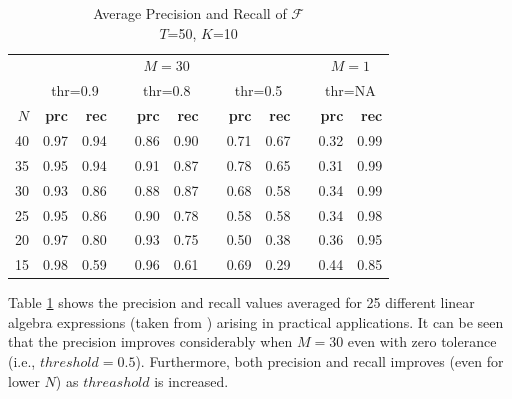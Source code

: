 \documentclass[conference]{IEEEtran}
\begin{document}
\begin{table}[h!]
	\begin{center}
		\renewcommand{\arraystretch}{1.2}
		\begin{tabular}{@{}r rr c rr c rr c rr@{}}
			\toprule
			& \multicolumn{8}{c}{$M=30$} & & \multicolumn{2}{c}{$M=1$} \\
			\cmidrule{2-9} \cmidrule{11-12}
			& \multicolumn{2}{c}{thr=0.9} & & \multicolumn{2}{c}{thr=0.8} & & \multicolumn{2}{c}{thr=0.5} & & \multicolumn{2}{c}{thr=NA} \\
			\cmidrule{2-3} \cmidrule{5-6} \cmidrule{8-9} \cmidrule{11-12}
			{$N$} & \textbf{prc} & \textbf{rec} && \textbf{prc} & \textbf{rec} && \textbf{prc} & \textbf{rec} && \textbf{prc} & \textbf{rec} \\
			\midrule
			{40} & 0.97  & 0.94  && 0.86  & 0.90  && 0.71  & 0.67 && 0.32 & 0.99 \\
			{35} & 0.95  & 0.94  && 0.91  & 0.87  && 0.78  & 0.65 && 0.31 & 0.99 \\
			{30} & 0.93  & 0.86  && 0.88  & 0.87  && 0.68  & 0.58 && 0.34 & 0.99 \\
			{25} & 0.95  & 0.86  && 0.90  & 0.78  && 0.58  & 0.58 && 0.34 & 0.98 \\
			{20} & 0.97  & 0.80  && 0.93  & 0.75  && 0.50  & 0.38 && 0.36 & 0.95 \\
			{15} & 0.98  & 0.59  && 0.96  & 0.61  && 0.69  & 0.29 && 0.44 & 0.85 \\
			\bottomrule
		\end{tabular}
		\caption{Average Precision and Recall of $\mathcal{F}$  \\ $T$=50, $K$=10}
		\label{tab:3}
	\end{center}
\end{table}
 Table \ref{tab:3} shows the precision and recall values averaged for 25 different linear algebra expressions (taken from \cite{barthels2019linnea}) arising in practical applications.  It can be seen that the precision improves considerably when $M=30$ even with zero tolerance (i.e., $threshold = 0.5$). Furthermore, both precision and recall improves (even for lower $N$) as $threashold$ is increased.
 
\end{document}
